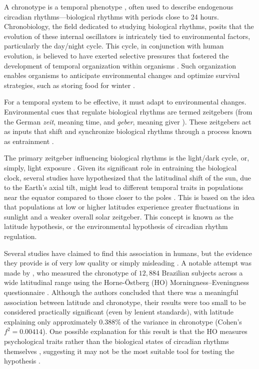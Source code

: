 \documentclass[
12pt,
openright,
oneside,
a4paper,
chapter=TITLE,
section=TITLE,
french,
spanish,
brazil,
english
]{abntex2}
\begin{document}
A chronotype is a temporal phenotype
\autocite{ehret1974a,pittendrigh1993}, often used to describe endogenous
circadian rhythms---biological rhythms with periods close to 24 hours.
Chronobiology, the field dedicated to studying biological rhythms,
posits that the evolution of these internal oscillators is intricately
tied to environmental factors, particularly the day/night cycle. This
cycle, in conjunction with human evolution, is believed to have exerted
selective pressures that fostered the development of temporal
organization within organisms
\autocite{pittendrigh1981,aschoff1989,paranjpe2005}. Such organization
enables organisms to anticipate environmental changes and optimize
survival strategies, such as storing food for winter
\autocite{aschoff1989a}.

For a temporal system to be effective, it must adapt to environmental
changes. Environmental cues that regulate biological rhythms are termed
zeitgebers (from the German \emph{zeit}, meaning time, and \emph{geber},
meaning giver \autocite{cambridgeuniversitypress}). These zeitgebers act
as inputs that shift and synchronize biological rhythms through a
process known as entrainment \autocite{khalsa2003,minors1991}.

The primary zeitgeber influencing biological rhythms is the light/dark
cycle, or, simply, light exposure
\autocite{aschoff1960,pittendrigh1960,roenneberg2016}. Given its
significant role in entraining the biological clock, several studies
have hypothesized that the latitudinal shift of the sun, due to the
Earth's axial tilt, might lead to different temporal traits in
populations near the equator compared to those closer to the poles
\autocite{bohlen1973,randler2008,leocadio-miguel2014,horzum2015,leocadio-miguel2017}.
This is based on the idea that populations at low or higher latitudes
experience greater fluctuations in sunlight and a weaker overall solar
zeitgeber. This concept is known as the latitude hypothesis, or the
environmental hypothesis of circadian rhythm regulation.

Several studies have claimed to find this association in humans, but the
evidence they provide is of very low quality or simply misleading
\autocites[e.g.,][]{randler2008,leocadio-miguel2014,horzum2015,leocadio-miguel2017,wang2023}.
A notable attempt was made by \textcite{leocadio-miguel2017}, who
measured the chronotype of \(12,884\) Brazilian subjects across a wide
latitudinal range using the Horne-Östberg (HO) Morningness--Eveningness
questionnaire \autocite{horne1976}. Although the authors concluded that
there was a meaningful association between latitude and chronotype,
their results were too small to be considered practically significant
(even by lenient standards), with latitude explaining only approximately
\(0.388\%\) of the variance in chronotype (Cohen's \(f^2 = 0.00414\)).
One possible explanation for this result is that the HO measures
psychological traits rather than the biological states of circadian
rhythms themselves \autocite{roenneberg2019c}, suggesting it may not be
the most suitable tool for testing the hypothesis
\autocite{leocadio-miguel2014}.
\end{document}
